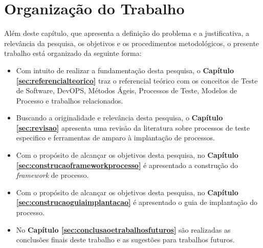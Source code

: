 \section{Organização do Trabalho}
\label{cap:estrutura}

Além deste capítulo, que apresenta a definição do problema e a justificativa, a relevância da pesquisa, os objetivos e os procedimentos metodológicos, o presente trabalho está organizado da seguinte forma:

\begin{itemize}
\item Com intuito de realizar a fundamentação desta pesquisa, o \textbf{Capítulo \ref{sec:referencialteorico}} traz o referencial teórico com os conceitos de Teste de Software, DevOPS, Métodos Ágeis, Processos de Teste, Modelos de Processo e trabalhos relacionados.
\item Buscando a originalidade e relevância desta pesquisa, o \textbf{Capítulo \ref{sec:revisao}} apresenta uma revisão da literatura sobre processos de teste especifico e ferramentas de amparo à implantação de processos.
\item Com o propósito de alcançar os objetivos desta pesquisa, no \textbf{Capítulo \ref{sec:construcaoframeworkprocesso}} é apresentado a construção do \textit{framework} de processo.
\item Com o propósito de alcançar os objetivos desta pesquisa, no \textbf{Capítulo \ref{sec:construcaoguiaimplantacao}} é apresentado o guia de implantação do processo.
\item No \textbf{Capítulo \ref{sec:conclusaoetrabalhosfuturos}} são realizadas as conclusões finais deste trabalho e as sugestões para trabalhos futuros.
\end{itemize}